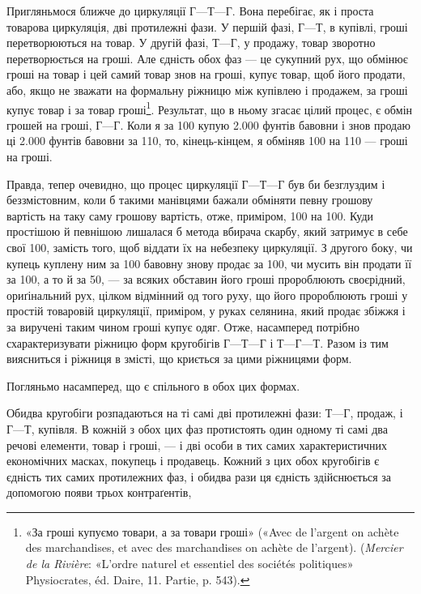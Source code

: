 Пригляньмося ближче до циркуляції $Г — Т — Г$. Вона перебігає,
як і проста товарова циркуляція, дві протилежні фази.
У першій фазі, $Г — Т$, в купівлі, гроші перетворюються на товар.
У другій фазі, $Т — Г$, у продажу, товар зворотно перетворюється
на гроші. Але єдність обох фаз — це сукупний рух, що
обмінює гроші на товар і цей самий товар знов на гроші, купує
товар, щоб його продати, або, якщо не зважати на формальну
ріжницю між купівлею і продажем, за гроші купує товар і за
товар гроші\footnote{
«За гроші купуємо товари, а за товари гроші» («Avec de l’argent
on achète des marchandises, et avec des marchandises on achète de l’argent).
(\emph{Mercier de la Rivière}: «L’ordre naturel et essentiel des sociétés
politiques» Physiocrates, éd. Daire, 11. Partie, p. 543).
}. Результат, що в ньому згасає цілий процес, є
обмін грошей на гроші, $Г — Г$. Коли я за 100
купую \num{2.000} фунтів бавовни і знов продаю ці \num{2.000} фунтів
бавовни за 110, то, кінець-кінцем, я
обміняв 100 на 110 — гроші
на гроші.

Правда, тепер очевидно, що процес циркуляції $Г — Т — Г$
був би безглуздим і беззмістовним, коли б такими манівцями
бажали обміняти певну грошову вартість на таку саму грошову
вартість, отже, приміром, 100 на 100. Куди простішою й певнішою лишалася б метода
вбирача скарбу, який затримує в себе свої 100,
замість того, щоб віддати їх на небезпеку циркуляції. З другого
боку, чи купець куплену ним за 100 бавовну
знову продає за 100, чи мусить він продати її за
100, а то й за 50, — за всяких
обставин його гроші пророблюють своєрідний, ориґінальний
рух, цілком відмінний од того руху, що його пророблюють
гроші у простій товаровій циркуляції, приміром, у руках селянина,
який продає збіжжя і за виручені таким чином гроші
купує одяг. Отже, насамперед потрібно схарактеризувати ріжницю
форм кругобігів $Г — Т — Г$ і $Т — Г — Т$. Разом із тим
виясниться і ріжниця в змісті, що криється за цими ріжницями
форм.

Погляньмо насамперед, що є спільного в обох цих формах.

Обидва кругобіги розпадаються на ті самі дві протилежні
фази: $Т — Г$, продаж, і $Г — Т$, купівля. В кожній з обох цих
фаз протистоять один одному ті самі два речові елементи, товар
і гроші, — і дві особи в тих самих характеристичних економічних
масках, покупець і продавець. Кожний з цих обох кругобігів
є єдність тих самих протилежних фаз, і обидва рази ця
єдність здійснюється за допомогою появи трьох контраґентів,
\parbreak{}  %

